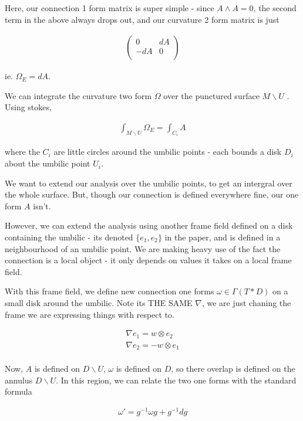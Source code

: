 \documentclass[11pt,onecolumn, a4page]{article}
\numberwithin{equation}{subsection}
\begin{document}
Here, our connection 1 form matrix is super simple - since $A \wedge A = 0$, the second term in the above always drops out, and our curvature 2 form matrix is just

\begin{eqnarray}
   \begin{pmatrix} 
 0 & dA\\
  -dA & 0 \\
 \end{pmatrix}
\end{eqnarray}

ie. $\Omega_{E} = dA $.

We can integrate the curvature two form  $\Omega$ over the punctured surface $M\backslash U$ . Using stokes,

\begin{eqnarray}
\int_{M\backslash U} \Omega_{E} = \int_{C_{i}}A
\end{eqnarray}

where the $C_{i}$ are little circles around the umbilic points - each bounds a disk $D_{i}$ about the umbilic point $U_{i}$.

We want to extend our analysis over the umbilic points, to get an intergral over the whole surface. But, though our connection is defined everywhere fine, our one form $A$ isn't.

However, we can extend the analysis using another frame field defined on a disk containing the umbilic - its denoted $\{e_{1}, e_{2}\}$ in the paper, and is defined in a neighbourhood of an umbilic point. We are making heavy use of the fact the connection is a local object - it only depends on values it takes on a local frame field.

With this frame field, we define new connection one forms $\omega \in \Gamma(T*D)$ on a small disk around the umbilic. Note its THE SAME $\nabla$, we are just chaning the frame we are expressing things with respect to.

\begin{eqnarray}
 \nabla e_{1} = w \otimes e_{2} \\
 \nabla e_{2} = -w \otimes e_{1} \\
\end{eqnarray}

Now, $A$ is defined on $D \backslash U$, $\omega$ is defined on $D$, so there overlap is defined on the annulus $D\backslash U$. In this region, we can relate the two one forms with the standard formula

\begin{eqnarray}
\omega' = g^{-1} \omega g + g^{-1}dg
\end{eqnarray}
\end{document}
